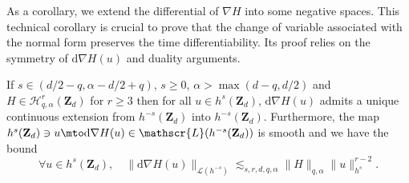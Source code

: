As a corollary, we extend the differential of $\nabla H$ into some negative spaces. This technical corollary is crucial to prove that the change of variable associated with the normal form preserves the time differentiability. Its proof relies on the symmetry of $\mathrm{d}\nabla H(u)$ and duality arguments.
\begin{corollary} \label{cor_extend} If $s\in (d/2-q, \alpha-d/2+q)$, $s\geq 0$, $\alpha >\max(d-q,d/2)$ and $ H\in \mathscr{H}_{q,\alpha}^r(\mathbf{Z}_d)$ for $r\geq 3$ then for all $u\in h^s(\mathbf{Z}_d)$, $\mathrm{d}\nabla H(u)$ admits a unique continuous extension from $h^{-s}(\mathbf{Z}_d)$ into $h^{-s}(\mathbf{Z}_d)$. Furthermore, the map $ h^s(\mathbf{Z}_d) \ni u \mto \mathrm{d}\nabla H(u) \in \mathscr{L}(h^{-s}(\mathbf{Z}_d))$ is smooth and we have the bound
\[
\forall u \in h^s(\mathbf{Z}_d), \quad \| \mathrm{d}\nabla H(u) \|_{\mathscr{L}(h^{-s})} \lesssim_{s,r,d,q,\alpha} \| H \|_{q,\alpha} \|u\|_{h^s}^{r-2}.
\]
\end{corollary}
